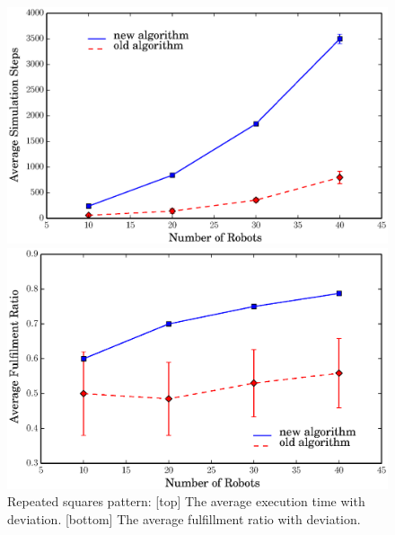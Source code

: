   
  \begin{figure}
    \begin{minipage}[b]{0.9\linewidth}
      \includegraphics[trim=0.5cm 0cm 1.5cm 0,clip=true,width=\linewidth]{figs/steps_square}
    \end{minipage}
    \begin{minipage}[b]{0.9\linewidth}
      \includegraphics[trim=0.5cm 0 1.5cm 0,clip=true,width=\linewidth]{figs/ratio_square}
    \end{minipage}
    \caption{Repeated squares pattern: [top] The average execution time with deviation. [bottom] The average fulfillment ratio with deviation.}
    \label{fig:sq_comp}
  \end{figure}
